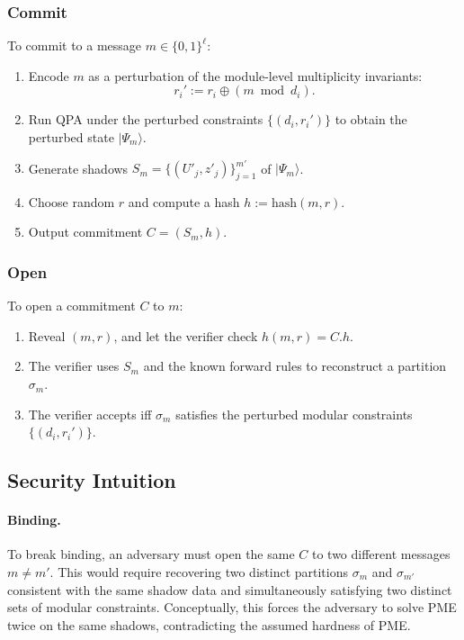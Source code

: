 \documentclass[11pt]{article}
\begin{document}
\subsubsection*{Commit}

To commit to a message $m \in \{0,1\}^\ell$:

\begin{enumerate}[label=(C\arabic*)]
  \item Encode $m$ as a perturbation of the module-level multiplicity invariants:
  \[
    r_i' := r_i \oplus (m \bmod d_i).
  \]
  \item Run QPA under the perturbed constraints $\{(d_i,r_i')\}$ to obtain the perturbed state $|\Psi_m\rangle$.
  \item Generate shadows $S_m = \{(U'_j,z'_j)\}_{j=1}^{m'}$ of $|\Psi_m\rangle$.
  \item Choose random $r$ and compute a hash $h := \mathrm{hash}(m,r)$.
  \item Output commitment $C = (S_m,h)$.
\end{enumerate}

\subsubsection*{Open}

To open a commitment $C$ to $m$:

\begin{enumerate}[label=(O\arabic*)]
  \item Reveal $(m,r)$, and let the verifier check $h(m,r) = C.h$.
  \item The verifier uses $S_m$ and the known forward rules to reconstruct a partition $\sigma_m$.
  \item The verifier accepts iff $\sigma_m$ satisfies the perturbed modular constraints $\{(d_i,r_i')\}$.
\end{enumerate}

\subsection{Security Intuition}

\paragraph{Binding.} To break binding, an adversary must open the same $C$ to two different messages $m \neq m'$. This would require recovering two distinct partitions $\sigma_m$ and $\sigma_{m'}$ consistent with the same shadow data and simultaneously satisfying two distinct sets of modular constraints. Conceptually, this forces the adversary to solve PME twice on the same shadows, contradicting the assumed hardness of PME.
\end{document}

